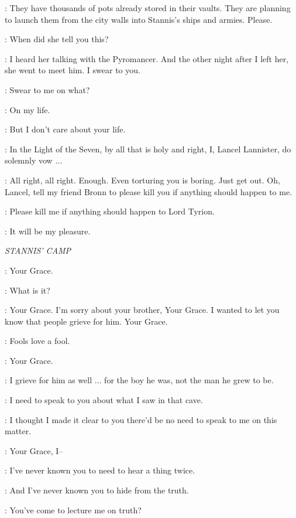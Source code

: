 \LANCEL: They have thousands of pots already stored in their vaults. They are planning to launch them from the city walls into Stannis's ships and armies. Please. 

\TYRION: When did she tell you this? 

\LANCEL: I heard her talking with the Pyromancer. And the other night after I left her, she went to meet him. I swear to you. 

\TYRION: Swear to me on what? 

\LANCEL: On my life. 

\TYRION: But I don't care about your life. 

\LANCEL: In the Light of the Seven, by all that is holy and right, I, Lancel Lannister, do solemnly vow $\ldots$  

\TYRION: All right, all right. Enough. Even torturing you is boring. Just get out. Oh, Lancel, tell my friend Bronn to please kill you if anything should happen to me. 


\LANCEL: Please kill me if anything should happen to Lord Tyrion. 

\BRONN: It will be my pleasure. 


\scene

\textit{STANNIS' CAMP} 


\DAVOS: Your Grace. 

\STANNIS: What is it? 

\DAVOS: Your Grace. I'm sorry about your brother, Your Grace. I wanted to let you know that people grieve for him. Your Grace. 

\STANNIS: Fools love a fool. 

\DAVOS: Your Grace. 

\STANNIS: I grieve for him as well $\ldots$ for the boy he was, not the man he grew to be. 

\DAVOS: I need to speak to you about what I saw in that cave. 

\STANNIS: I thought I made it clear to you there'd be no need to speak to me on this matter. 

\DAVOS: Your Grace, I-- 

\STANNIS: I've never known you to need to hear a thing twice. 

\DAVOS: And I've never known you to hide from the truth. 

\STANNIS: You've come to lecture me on truth? 

